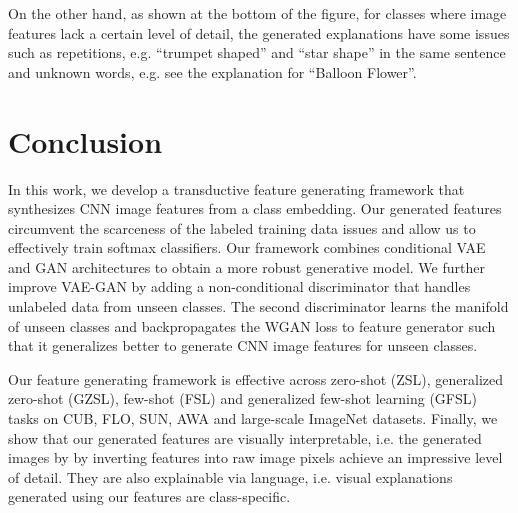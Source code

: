 \documentclass[10pt,twocolumn,letterpaper]{article}
\begin{document}
On the other hand, as shown at the bottom of the figure, for classes where image features lack a certain level of detail, the generated explanations have some issues such as repetitions, e.g. ``trumpet shaped'' and ``star shape'' in the same sentence and unknown words, e.g. see the explanation for ``Balloon Flower''.

\section{Conclusion}
In this work, we develop a transductive feature generating framework that synthesizes CNN image features from a class embedding. Our generated features circumvent the scarceness of the labeled training data issues and allow us to effectively train softmax classifiers. Our framework combines conditional VAE and GAN architectures to obtain a more robust generative model. We further improve VAE-GAN by adding a non-conditional discriminator that handles unlabeled data from unseen classes. The second discriminator learns the manifold of unseen classes and backpropagates the WGAN loss to feature generator such that it generalizes better to generate CNN image features for unseen classes. 

Our feature generating framework is effective across zero-shot (ZSL), generalized zero-shot (GZSL), few-shot (FSL) and generalized few-shot learning (GFSL) tasks on CUB, FLO, SUN, AWA and large-scale ImageNet datasets. Finally, we show that our generated features are visually interpretable, i.e. the generated images by by inverting features into raw image pixels achieve an impressive level of detail. They are also explainable via language, i.e. visual explanations generated using our features are class-specific.



{\small


}
\end{document}

